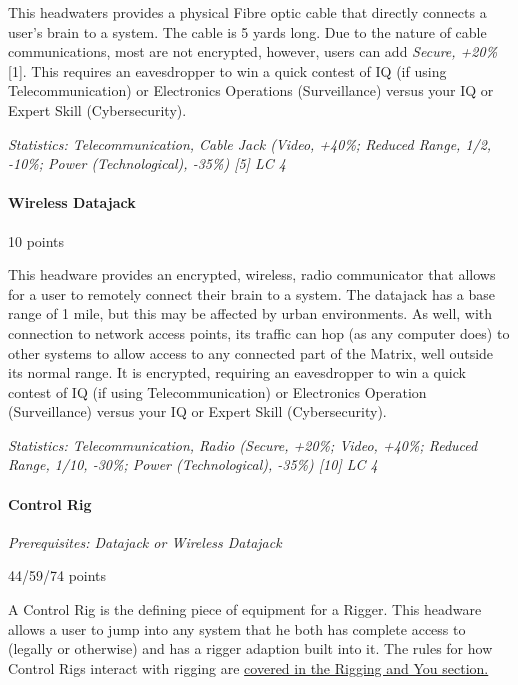 \begin{multicols*}{3}
	This headwaters provides a physical Fibre optic cable that directly connects a user's brain to a system. The cable is 5 yards long. Due to the nature of cable communications, most are not encrypted, however, users can add \textit{Secure, +20\%} [1]. This requires an eavesdropper to win a quick contest of IQ (if using Telecommunication) or Electronics Operations (Surveillance) versus your IQ or Expert Skill (Cybersecurity).
	
	\textit{\textcolor{OliveGreen}{Statistics: Telecommunication, Cable Jack (Video, +40\%; Reduced Range, 1/2, -10\%; Power (Technological), -35\%) [5] LC 4}}
	
	\paragraph{Wireless Datajack}
	\begin{flushright}
		10 points
	\end{flushright}
	
	This headware provides an encrypted, wireless, radio communicator that allows for a user to remotely connect their brain to a system. The datajack has a base range of 1 mile, but this may be affected by urban environments. As well, with connection to network access points, its traffic can hop (as any computer does) to other systems to allow access to any connected part of the Matrix, well outside its normal range. It is encrypted, requiring an eavesdropper to win a quick contest of IQ (if using Telecommunication) or Electronics Operation (Surveillance) versus your IQ or Expert Skill (Cybersecurity).
	
	\textit{\textcolor{OliveGreen}{Statistics: Telecommunication, Radio (Secure, +20\%; Video, +40\%; Reduced Range, 1/10, -30\%; Power (Technological), -35\%) [10] LC 4}}
	
	\paragraph{Control Rig}\label{control_rig}
	\textit{Prerequisites: Datajack or Wireless Datajack}
	\begin{flushright}
		44/59/74 points
	\end{flushright}
	
	A Control Rig is the defining piece of equipment for a Rigger. This headware allows a user to jump into any system that he both has complete access to (legally or otherwise) and has a rigger adaption built into it. The rules for how Control Rigs interact with rigging are \hyperref[riggers]{covered in the Rigging and You section.}
	

\end{multicols*}
